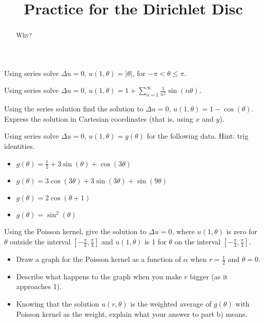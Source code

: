 \documentclass{ximera}
\title{Practice for the Dirichlet Disc}
\begin{document}
\begin{abstract}
Why?
\end{abstract}
\maketitle


\begin{exercise}
    Using series solve $\Delta u = 0$, $u(1,\theta) = \lvert \theta \rvert$, for $-\pi < \theta \leq \pi$.
\end{exercise}

\begin{exercise}%
    Using series solve $\Delta u = 0$, $u(1,\theta) = 1+ \sum\limits_{n=1}^\infty \frac{1}{n^2}\sin(n\theta)$.
\end{exercise}

\begin{exercise}%
    Using the series solution find the solution to $\Delta u = 0$, $u(1,\theta) = 1- \cos(\theta)$.  Express the solution in Cartesian coordinates (that is, using $x$ and $y$).
\end{exercise}

\begin{exercise}
    Using series solve $\Delta u = 0$, $u(1,\theta) = g(\theta)$ for the following data.  Hint: trig identities.
    \begin{itemize}
        \item $g(\theta) = \frac{1}{2} + 3\sin(\theta) + \cos(3\theta)$
        \item $g(\theta) = 3\cos(3\theta) + 3\sin(3\theta) + \sin(9\theta)$
        \item $g(\theta) = 2 \cos(\theta+1)$
        \item $g(\theta) = \sin^2(\theta)$
    \end{itemize}
\end{exercise}

\begin{exercise}
    Using the Poisson kernel, give the solution to $\Delta u = 0$, where $u(1,\theta)$ is zero for $\theta$ outside the interval $[-\frac{\pi}{4},\frac{\pi}{4}]$ and  $u(1,\theta)$ is 1 for $\theta$ on the interval $[-\frac{\pi}{4},\frac{\pi}{4}]$.
\end{exercise}

\begin{exercise}
    \begin{itemize}
        \item Draw a graph for the Poisson kernel as a function of $\alpha$ when $r=\frac{1}{2}$ and $\theta = 0$. 
        \item Describe what happens to the graph when you make $r$ bigger (as it approaches 1).
        \item Knowing that the solution $u(r,\theta)$ is the weighted average of $g(\theta)$ with Poisson kernel as the weight, explain what your answer to part b) means.
    \end{itemize}
\end{exercise}
\end{document}

